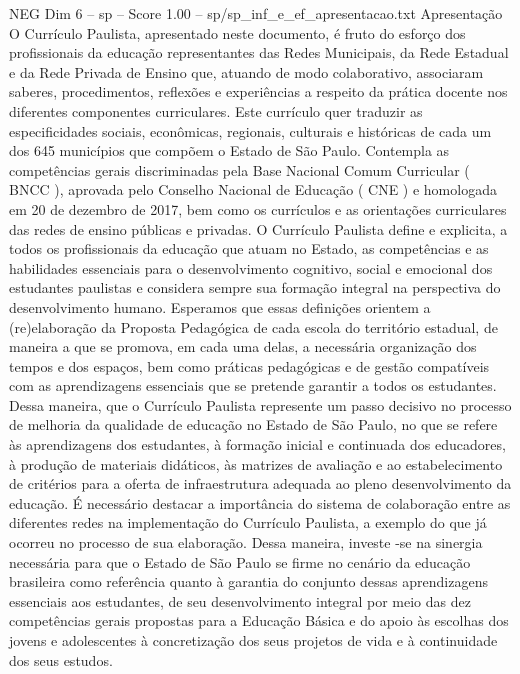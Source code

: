 \begin{textsample}{NEG Dim 6 – sp – Score 1.00 – sp/sp\_inf\_e\_ef\_apresentacao.txt}  \label{ex:f6_neg_209}
Apresentação O Currículo Paulista, apresentado neste documento, é fruto do esforço dos profissionais da educação representantes das Redes Municipais, da Rede Estadual e da Rede Privada de Ensino que, atuando de modo colaborativo, associaram saberes, procedimentos, reflexões e experiências a respeito da prática docente nos diferentes componentes curriculares.
Este currículo quer traduzir as especificidades sociais, econômicas, regionais, culturais e históricas de cada um dos 645 municípios que compõem o Estado de São Paulo.
Contempla as competências gerais discriminadas pela Base Nacional Comum Curricular ( BNCC ), aprovada pelo Conselho Nacional de Educação ( CNE ) e homologada em 20 de dezembro de 2017, bem como os currículos e as orientações curriculares das redes de ensino públicas e privadas.
O Currículo Paulista define e explicita, a todos os profissionais da educação que atuam no Estado, as competências e as habilidades essenciais para o desenvolvimento cognitivo, social e emocional dos estudantes paulistas e considera sempre sua formação integral na perspectiva do desenvolvimento humano.
Esperamos que essas definições orientem a (re)elaboração da Proposta Pedagógica de cada escola do território estadual, de maneira a que se promova, em cada uma delas, a necessária organização dos tempos e dos espaços, bem como práticas pedagógicas e de gestão compatíveis com as aprendizagens essenciais que se pretende garantir a todos os estudantes.
Dessa maneira, que o Currículo Paulista represente um passo decisivo no processo de melhoria da qualidade de educação no Estado de São Paulo, no que se refere às aprendizagens dos estudantes, à formação inicial e continuada dos educadores, à produção de materiais didáticos, às matrizes de avaliação e ao estabelecimento de critérios para a oferta de infraestrutura adequada ao pleno desenvolvimento da educação.
É necessário destacar a importância do sistema de colaboração entre as diferentes redes na implementação do Currículo Paulista, a exemplo do que já ocorreu no processo de sua elaboração.
Dessa maneira, investe -se na sinergia necessária para que o Estado de São Paulo se firme no cenário da educação brasileira como referência quanto à garantia do conjunto dessas aprendizagens essenciais aos estudantes, de seu desenvolvimento integral por meio das dez competências gerais propostas para a Educação Básica e do apoio às escolhas dos jovens e adolescentes à concretização dos seus projetos de vida e à continuidade dos seus estudos.

\end{textsample}
